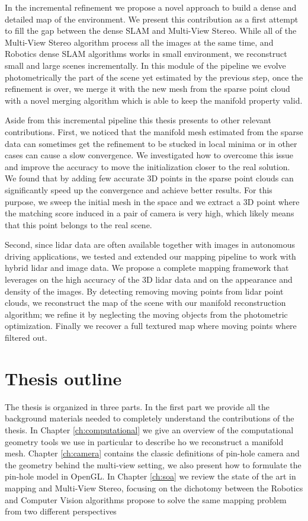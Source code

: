 In the incremental refinement we propose a novel approach to build a dense and detailed map of the environment. 
We present this contribution as a first attempt to fill the gap between the dense SLAM and Multi-View Stereo.
While all of the Multi-View Stereo algorithm process all the images  at the same time, and Robotics dense SLAM algorithms works in small environment, we reconstruct small and large scenes incrementally. 
In this module of the pipeline we evolve photometrically the part of the scene yet estimated by the previous step, once the refinement is over, we merge it with the new mesh from the sparse point cloud with a novel merging algorithm which is able to keep the manifold property valid.

Aside from this incremental pipeline this thesis presents to other relevant contributions.
First, we noticed that the manifold mesh estimated from the sparse data can sometimes get the refinement to be stucked  in local minima or in other cases can cause a slow convergence. 
We investigated how to overcome this issue and improve the accuracy to move the initialization closer to the real solution.
We found that by adding few accurate 3D points in the sparse point clouds can significantly speed up the convergence and achieve better results.
For this purpose, we sweep the initial mesh in the space and we extract a 3D point where the matching score induced in a pair of camera is very high, which likely means that this point belongs to the real scene.

Second, since lidar data are often available together with images in autonomous driving applications, we tested and extended our mapping pipeline to work with hybrid lidar and image data.
We propose a complete mapping framework  that leverages on the high accuracy of the 3D lidar data and on the appearance and density of the images.
By detecting removing moving points from lidar point clouds, we reconstruct the map of the scene with our manifold reconstruction algorithm; we refine it by neglecting the moving objects from the photometric optimization. Finally we recover a full textured map where moving points where filtered out.



\section{Thesis outline}

The thesis is organized in three parts. 
In the first part we provide all the background materials needed to completely understand the contributions of the thesis.
In Chapter \ref{ch:computational} we give an overview of the computational geometry tools we use in particular to describe ho we reconstruct a manifold mesh.  
Chapter \ref{ch:camera} contains the classic definitions of pin-hole camera and the geometry behind the  multi-view setting, we also present how to formulate the pin-hole model in OpenGL.
In Chapter \ref{ch:soa} we review the state of the art in mapping and Multi-View Stereo, focusing on the dichotomy between the Robotics and  Computer Vision algorithms propose to solve the same mapping problem from two different perspectives


